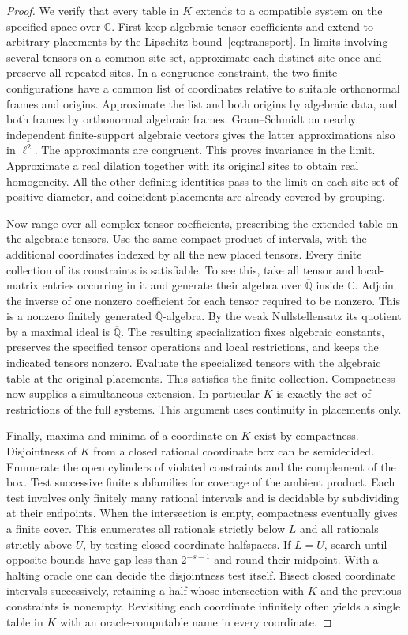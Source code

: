 \documentclass[11pt,letterpaper]{article}
\theoremstyle{definition}
\newcommand{\Q}{\mathbb Q}
\newcommand{\C}{\mathbb C}
\begin{document}
\begin{proof}
We verify that every table in \(K\) extends to a compatible system on
the specified space over \(\C\). First keep algebraic tensor coefficients
and extend to arbitrary placements by the Lipschitz bound~\eqref{eq:transport}.
In limits involving several tensors on a common site set, approximate
each distinct site once and preserve all repeated sites. In a congruence
constraint, the two finite configurations have a common list of coordinates
relative to suitable orthonormal frames and origins. Approximate the list
and both origins by algebraic data, and both frames by orthonormal
algebraic frames. Gram--Schmidt on nearby independent finite-support
algebraic vectors gives the latter approximations also in \(\ell^2\).
The approximants are congruent. This proves invariance in the limit.
Approximate a real dilation together with its original sites to obtain
real homogeneity. All the other defining identities pass to the limit
on each site set of positive diameter, and coincident placements are
already covered by grouping.

Now range over all complex tensor coefficients, prescribing the extended
table on the algebraic tensors. Use the same compact product of intervals,
with the additional coordinates indexed by all the new placed tensors.
Every finite collection of its constraints is satisfiable. To see this,
take all tensor and local-matrix entries occurring in it and generate
their algebra over \(\overline{\Q}\) inside \(\C\). Adjoin the inverse of
one nonzero coefficient for each tensor required to be nonzero. This is a
nonzero finitely generated \(\overline{\Q}\)-algebra. By the weak
Nullstellensatz its quotient by a maximal ideal is \(\overline{\Q}\).
The resulting specialization fixes algebraic constants, preserves the
specified tensor operations and local restrictions, and keeps the indicated
tensors nonzero. Evaluate the specialized tensors with the algebraic table
at the original placements. This satisfies the finite collection.
Compactness now supplies a simultaneous extension. In particular \(K\)
is exactly the set of restrictions of the full systems. This argument
uses continuity in placements only.

Finally, maxima and minima of a coordinate on \(K\) exist by compactness.
Disjointness of \(K\) from a closed rational coordinate box can be
semidecided. Enumerate the open cylinders of violated constraints and the
complement of the box. Test successive finite subfamilies for coverage
of the ambient product. Each test involves only finitely many rational
intervals and is decidable by subdividing at their endpoints. When the
intersection is empty, compactness eventually gives a finite cover.
This enumerates all rationals strictly below \(L\) and all rationals
strictly above \(U\), by testing closed coordinate halfspaces. If \(L=U\),
search until opposite bounds have gap less than \(2^{-s-1}\) and round
their midpoint. With a halting oracle one can decide the disjointness
test itself. Bisect closed coordinate intervals successively, retaining
a half whose intersection with \(K\) and the previous constraints is
nonempty. Revisiting each coordinate infinitely often yields a single
table in \(K\) with an oracle-computable name in every coordinate.
\end{proof}
\end{document}
